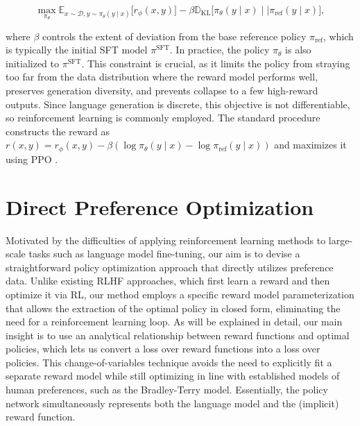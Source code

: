 \begin{equation}\label{eq:RL}
\max_{\pi_{\theta}}  \mathbb{E}_{x\sim \mathcal{D}, y\sim \pi_{\theta}(y \mid x)}\bigl[r_{\phi}(x, y)\bigr] - \beta\mathbb{D}_{\textrm{KL}}\bigl[\pi_{\theta}(y\mid x)\mid \mid \pi_\text{ref}(y\mid x)\bigr],
\end{equation}

where $\beta$ controls the extent of deviation from the base reference policy $\pi_\text{ref}$, which is typically the initial SFT model $\pi^\text{SFT}$. In practice, the policy $\pi_\theta$ is also initialized to $\pi^\text{SFT}$. This constraint is crucial, as it limits the policy from straying too far from the data distribution where the reward model performs well, preserves generation diversity, and prevents collapse to a few high-reward outputs. Since language generation is discrete, this objective is not differentiable, so reinforcement learning is commonly employed. The standard procedure \citep{ziegler2020finetuning, stiennon2022learning, bai2022training, ouyang2022training} constructs the reward as ${r(x, y) = r_{\phi}(x, y) -\beta (\log \pi_{\theta}(y\mid x) - \log \pi_\text{ref}(y\mid x))}$ and maximizes it using PPO \cite{schulman2017proximal}.

\section{Direct Preference Optimization}\label{sec:DPO}

Motivated by the difficulties of applying reinforcement learning methods to large-scale tasks such as language model fine-tuning, our aim is to devise a straightforward policy optimization approach that directly utilizes preference data. Unlike existing RLHF approaches, which first learn a reward and then optimize it via RL, our method employs a specific reward model parameterization that allows the extraction of the optimal policy in closed form, eliminating the need for a reinforcement learning loop. As will be explained in detail, our main insight is to use an analytical relationship between reward functions and optimal policies, which lets us convert a loss over reward functions into a loss over policies. This change-of-variables technique avoids the need to explicitly fit a separate reward model while still optimizing in line with established models of human preferences, such as the Bradley-Terry model. Essentially, the policy network simultaneously represents both the language model and the (implicit) reward function.

